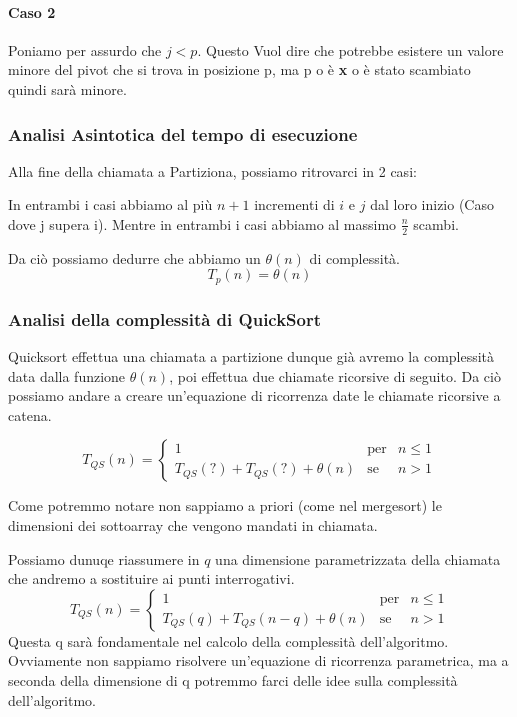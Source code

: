 \paragraph{Caso 2}
Poniamo per assurdo che $j<p$. Questo Vuol dire che potrebbe esistere un valore minore del pivot che si trova in posizione p, ma p o è \textbf{x} o è stato scambiato quindi sarà minore.

\subsubsection{Analisi Asintotica del tempo di esecuzione}

Alla fine della chiamata a Partiziona, possiamo ritrovarci in 2 casi:
\smallskip

In entrambi i casi abbiamo al più $n+1$ incrementi di $i$ e $j$ dal loro inizio (Caso dove j supera i). Mentre in entrambi i casi abbiamo al massimo $\frac{n}{2}$ scambi.

Da ciò possiamo dedurre che abbiamo un $\theta(n)$ di complessità. 
$$T_p(n) = \theta(n)$$

\subsubsection{Analisi della complessità di QuickSort}

Quicksort  effettua una chiamata a partizione dunque già avremo la complessità data dalla funzione $\theta(n)$, poi effettua due chiamate ricorsive di seguito. Da ciò possiamo andare a creare un'equazione di ricorrenza date le chiamate ricorsive a catena.

$$T_{QS}(n) = \left\{ \begin{array}{rcl}
    1 &\mbox{per} & n\le 1\\
    T_{QS}(?) + T_{QS}(?) + \theta(n) & \mbox{se} & n>1
    \end{array}\right.$$

Come potremmo notare non sappiamo a priori (come nel mergesort) le dimensioni dei sottoarray che vengono mandati in chiamata.\smallskip

Possiamo dunuqe riassumere in $q$ una dimensione parametrizzata della chiamata che andremo a sostituire ai punti interrogativi.\smallskip
$$T_{QS}(n) = \left\{ \begin{array}{rcl}
    1 &\mbox{per} & n\le 1\\
    T_{QS}(q) + T_{QS}(n-q) + \theta(n) & \mbox{se} & n>1
    \end{array}\right.$$
Questa q sarà fondamentale nel calcolo della complessità dell'algoritmo. Ovviamente non sappiamo risolvere un'equazione di ricorrenza parametrica, ma a seconda della dimensione di q potremmo farci delle idee sulla complessità dell'algoritmo.\medskip

